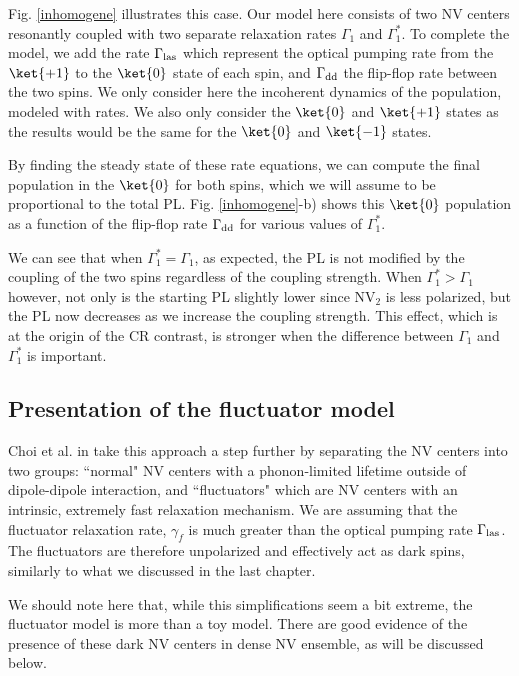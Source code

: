 \documentclass[a4paper,11pt]{report}
\begin{document}
\begin{refsection}
Fig. \ref{inhomogene} illustrates this case. Our model here consists of two NV centers resonantly coupled with two separate relaxation rates $\Gamma_1$ and $\Gamma_1^*$. To complete the model, we add the rate $\Gamma_{\rm las}$ which represent the optical pumping rate from the $\ket{+1}$ to the $\ket{0}$ state of each spin, and $\Gamma_{\rm dd}$ the flip-flop rate between the two spins. We only consider here the incoherent dynamics of the population, modeled with rates. We also only consider the $\ket{0}$ and $\ket{+1}$ states as the results would be the same for the $\ket{0}$ and $\ket{-1}$ states. 

By finding the steady state of these rate equations, we can compute the final population in the $\ket{0}$ for both spins, which we will assume to be proportional to the total PL. Fig. \ref{inhomogene}-b) shows this $\ket{0}$ population as a function of the flip-flop rate $\Gamma_{\rm dd}$ for various values of $\Gamma_1^*$.

We can see that when $\Gamma_1^*=\Gamma_1$, as expected, the PL is not modified by the coupling of the two spins regardless of the coupling strength. When $\Gamma_1^*>\Gamma_1$ however, not only is the starting PL slightly lower since NV$_2$ is less polarized, but the PL now decreases as we increase the coupling strength. This effect, which is at the origin of the CR contrast, is stronger when the difference between $\Gamma_1$ and $\Gamma_1^*$ is important.

\subsection{Presentation of the fluctuator model}
Choi et al. in \citep{choi2017depolarization} take this approach a step further by separating the NV centers into two groups: ``normal" NV centers with a phonon-limited lifetime outside of dipole-dipole interaction, and ``fluctuators" which are NV centers with an intrinsic, extremely fast relaxation mechanism. We are assuming that the fluctuator relaxation rate, $\gamma_f$ is much greater than the optical pumping rate $\Gamma_{\rm las}$. The fluctuators are therefore unpolarized and effectively act as dark spins, similarly to what we discussed in the last chapter.

We should note here that, while this simplifications seem a bit extreme, the fluctuator model is more than a toy model. There are good evidence of the presence of these dark NV centers in dense NV ensemble, as will be discussed below.


\end{refsection}
\end{document}
